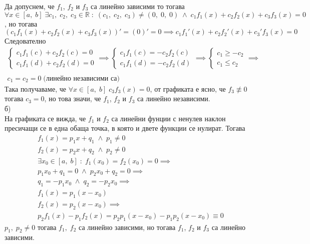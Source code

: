 \documentclass[a4paper, 12pt, oneside]{article}
\newcommand{\R}{\mathbb{R}}
\begin{document}
Да допуснем, че $f_1$, $f_2$ и $f_3$ са линейно зависими то тогава \\
$\forall x \in [a, \; b] \; \exists c_1, \; c_2, \; c_3 \in \R \; : \; (c_1, \; c_2, \; c_3) \neq (0, \; 0, \; 0) \; \land \;
 c_1f_1(x) + c_2f_2(x) + c_3f_3(x) = 0$, но тогава $(c_1f_1(x) + c_2f_2(x) + c_3f_3(x))' = (0)' = 0 \implies c_1f_1'(x) + c_2f_2'(x) + c_3'f_3(x) = 0$
Следователно
\begin{align*}
    \begin{cases}
        c_1f_1(c) + c_2f_2(c) = 0 \\
        c_1f_1(d) + c_2f_2(d) = 0
    \end{cases} \implies \begin{cases}
        c_1f_1(c) = -c_2f_2(c) \\
        c_1f_1(d) = -c_2f_2(d)
    \end{cases} \implies \begin{cases}
        c_1 \geq -c_2 \\
        c_1 \leq c_2
    \end{cases} \implies \\\\
    c_1 = c_2 = 0 \; \text{(линейно независими са)}
\end{align*}
Така получаваме, че $\forall x \in [a, \; b] \; c_3f_3(x) = 0$,
от графиката е ясно, че $f_3 \not\equiv 0$ тогава $c_3 = 0$,
но това значи, че $f_1$, $f_2$ и $f_3$ са линейно независими. \\

б) \\

На графиката се вижда, че $f_1$ и $f_2$ са линейни фунции
с ненулев наклон пресичащи се в една обаща точка, в която
и двете функции се нулират. Тогава
\begin{align*}
    f_1(x) = p_1x + q_1 \; \land \; p_1 \neq 0 \\
    f_2(x) = p_2x + q_2 \; \land \; p_2 \neq 0 \\
    \exists x_0 \in [a, \; b] \; : \; f_1(x_0) = f_2(x_0) = 0 \implies \\
    p_1x_0 + q_1 = 0 \; \land \; p_2x_0 + q_2 = 0 \implies \\
    q_1 = -p_1x_0  \; \land \; q_2 = -p_2x_0 \implies \\
    f_1(x) = p_1(x - x_0) \\
    f_2(x) = p_2(x - x_0) \implies \\
    p_2f_1(x) - p_1f_2(x) = p_2p_1(x - x_0) - p_1p_2(x - x_0) \equiv 0
\end{align*}
$p_1, \; p_2 \neq 0$  тогава $f_1, \; f_2$ са линейно зависими,
но тогава $f_1$, $f_2$ и $f_3$ са линейно зависими.
\end{document}
